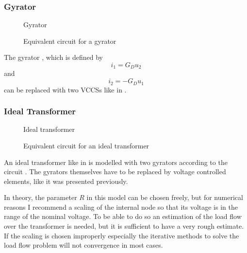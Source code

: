 \subsubsection{Gyrator}

\begin{figure}
	\centering
	
	\caption{Gyrator}
	\label{fig:gyrator_original}
\end{figure}

\begin{figure}
	\centering
	
	\caption{Equivalent circuit for a gyrator}
	\label{fig:gyrator_equivalent}
\end{figure}

The gyrator , which is defined by
\begin{equation}
	i_1 = G_D u_2
\end{equation}
and
\begin{equation}
	i_2 = -G_D u_1
\end{equation}
can be replaced with two VCCSs like in .

\subsubsection{Ideal Transformer}

\begin{figure}
	\centering
	
	\caption{Ideal transformer}
	\label{fig:ideal_transformer_original}
\end{figure}

\begin{figure}
	\centering
	
	\caption{Equivalent circuit for an ideal transformer}
	\label{fig:ideal_transformer_equivalent}
\end{figure}

An ideal transformer like in  is modelled with two gyrators according to the circuit . The gyrators themselves have to be replaced by voltage controlled elements, like it was presented previously.

In theory, the parameter $R$ in this model can be chosen freely, but for numerical reasons I recommend a scaling of the internal node so that its voltage is in the range of the nominal voltage. To be able to do so an estimation of the load flow over the transformer is needed, but it is sufficient to have a very rough estimate. If the scaling is chosen improperly especially the iterative methods to solve the load flow problem will not convergence in most cases.

